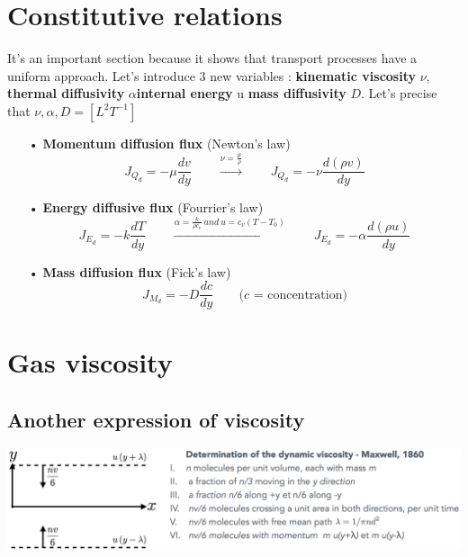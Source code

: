 \section{Constitutive relations}
	It's an important section because it shows that transport processes have a uniform approach. Let's introduce 3 new variables : \textbf{kinematic viscosity} $\nu$, \textbf{thermal diffusivity }$\alpha$\textbf{internal energy} u \textbf{mass diffusivity} $D$. Let's precise that $\nu , \alpha , D = [L^2T^{-1}]$\\
	\begin{itemize}
		\item[•] \textbf{Momentum diffusion flux} (Newton's law)
		\begin{equation}
			J_{Q_d}=-\mu \frac{dv}{dy} \qquad \xrightarrow {\nu = \frac{\mu}{\rho}} \qquad J_{Q_d}=-\nu \frac{d(\rho v)}{dy}
			\label{equation:1.11}
		\end{equation}
		
		\item[•] \textbf{Energy diffusive flux} (Fourrier's law)
		\begin{equation}
			J_{E_d} = -k\frac{dT}{dy} \qquad \xrightarrow{\alpha = \frac{k}{\rho c_v} \ and \ u = c_v(T-T_0)} \qquad J_{E_d} = -\alpha\frac{d(\rho u)}{dy}
		\end{equation}
		
		\item[•] \textbf{Mass diffusion flux} (Fick's law)
		\begin{equation}
			J_{M_d} = -D \frac{dc}{dy} \qquad \mbox{($c$ = concentration)}
		\end{equation}
	\end{itemize}
	
\section{Gas viscosity}
\subsection{Another expression of viscosity}
	\begin{center}
	\includegraphics[scale=0.45]{ch1/8}
	\end{center}
	
